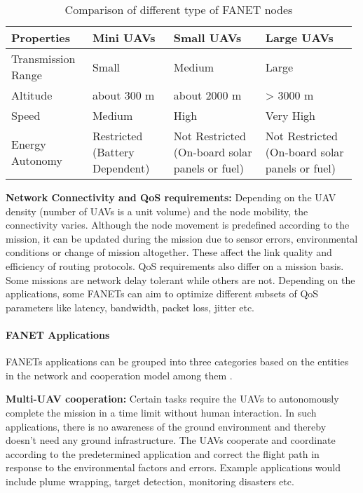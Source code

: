 \begin{table}
\caption{Comparison of different type of FANET nodes}
\label{tab:uav_comparison}
\begin{tabular}{|p{0.23\linewidth}|p{0.23\linewidth}|p{0.26\linewidth}|p{0.26\linewidth}|}
\toprule
Properties & Mini UAVs & Small UAVs & Large UAVs\\
\midrule
Transmission Range & Small & Medium & Large\\
\midrule
Altitude 	&  about 300 m   & about 2000 m  &  > 3000 m \\
\midrule
Speed & Medium & High & Very High \\
\midrule
Energy Autonomy & Restricted (Battery Dependent) & Not Restricted (On-board solar panels or fuel) &  Not Restricted (On-board solar panels or fuel) \\
\bottomrule
\end{tabular}
\end{table}

\textbf{Network Connectivity and QoS requirements:} Depending on the UAV density (number of UAVs is a unit volume) and the node mobility, the connectivity varies. Although the node movement is predefined according to the mission, it can be updated during the mission due to sensor errors, environmental conditions or change of mission altogether. These affect the link quality and efficiency of routing protocols. QoS requirements also differ on a mission basis. Some missions are network delay tolerant while others are not. Depending on the applications, some FANETs can aim to optimize different subsets of QoS parameters like latency, bandwidth, packet loss, jitter etc.

\paragraph{FANET Applications}
FANETs applications can be grouped into three categories based on the entities in the network and cooperation model among them \cite{BEKMEZCI20131254}.

\textbf{Multi-UAV cooperation:} Certain tasks require the UAVs to autonomously complete the mission in a time limit without human interaction. In such applications, there is no awareness of the ground environment and thereby doesn't need any ground infrastructure. The UAVs cooperate and coordinate according to the predetermined application and correct the flight path in response to the environmental factors and errors. Example applications would include plume wrapping, target detection, monitoring disasters etc. 

